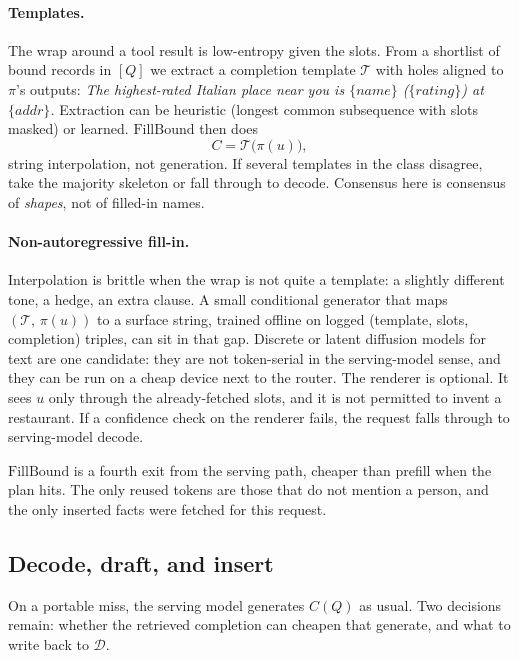 \paragraph{Templates.}
The wrap around a tool result is low-entropy given the slots. From a shortlist of bound records in $[Q]$ we extract a completion template $\mathcal{T}$ with holes aligned to $\pi$'s outputs: \emph{The highest-rated Italian place near you is $\{name\}$ ($\{rating\}$) at $\{addr\}$.} Extraction can be heuristic (longest common subsequence with slots masked) or learned. $\mathrm{FillBound}$ then does
\begin{equation}
\label{eq:fill}
C
  = \mathcal{T}\bigl(\pi(u)\bigr),
\end{equation}
string interpolation, not generation. If several templates in the class disagree, take the majority skeleton or fall through to decode. Consensus here is consensus of \emph{shapes}, not of filled-in names.

\paragraph{Non-autoregressive fill-in.}
Interpolation is brittle when the wrap is not quite a template: a slightly different tone, a hedge, an extra clause. A small conditional generator that maps $(\mathcal{T},\,\pi(u))$ to a surface string, trained offline on logged (template, slots, completion) triples, can sit in that gap. Discrete or latent diffusion models for text are one candidate: they are not token-serial in the serving-model sense, and they can be run on a cheap device next to the router. The renderer is optional. It sees $u$ only through the already-fetched slots, and it is not permitted to invent a restaurant. If a confidence check on the renderer fails, the request falls through to serving-model decode.

$\mathrm{FillBound}$ is a fourth exit from the serving path, cheaper than prefill when the plan hits. The only reused tokens are those that do not mention a person, and the only inserted facts were fetched for this request.

\subsection{Decode, draft, and insert}
\label{sec:method-miss}

On a portable miss, the serving model generates $C(Q)$ as usual. Two decisions remain: whether the retrieved completion can cheapen that generate, and what to write back to $\mathcal{D}$.

